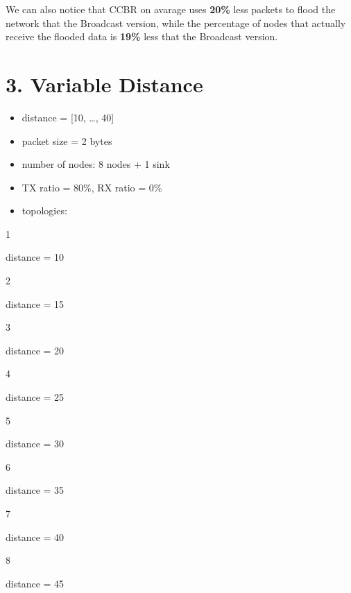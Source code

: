 \documentclass[11pt]{article}
\providecommand{\tightlist}{%
      \setlength{\itemsep}{0pt}\setlength{\parskip}{0pt}}
\begin{document}
We can also notice that CCBR on avarage uses \textbf{20\%} less packets
to flood the network that the Broadcast version, while the percentage of
nodes that actually receive the flooded data is \textbf{19\%} less that
the Broadcast version.

    \hypertarget{variable-distance}{%
\section{3. Variable Distance}\label{variable-distance}}

\begin{itemize}
\tightlist
\item
  distance = {[}10, \ldots{}, 40{]}
\item
  packet size = 2 bytes
\item
  number of nodes: 8 nodes + 1 sink
\item
  TX ratio = 80\%, RX ratio = 0\%
\item
  topologies:
\end{itemize}

1

distance = 10

2

distance = 15

3

distance = 20

4

distance = 25

5

distance = 30

6

distance = 35

7

distance = 40

8

distance = 45
\end{document}
